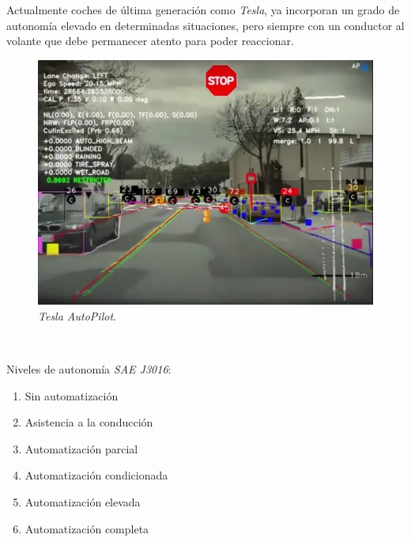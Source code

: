Actualmente coches de última generación como \textit{Tesla}, ya incorporan un grado de autonomía elevado en determinadas situaciones, pero siempre con un conductor al volante que debe permanecer atento para poder reaccionar.\\

\begin{figure} [h!]
	\begin{center}
		\includegraphics[width=12cm]{figs/tesla_object_detection}
	\end{center}
	\caption{\textit{Tesla AutoPilot}.}
	\label{fig:tesla_object_detection}
\end{figure}\

Niveles de autonomía \textit{SAE J3016}:

\begin{enumerate}
	\item Sin automatización
	\item Asistencia a la conducción
	\item Automatización parcial
	\item Automatización condicionada
	\item Automatización elevada
	\item Automatización completa
\end{enumerate}\

